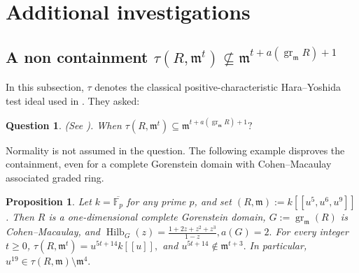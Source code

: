 \documentclass[11pt,a4paper]{amsart}
\numberwithin{equation}{section}
\newtheorem{proposition}[theorem]{Proposition}
\newtheorem{question}[theorem]{Question}
\newcommand{\gr}{\operatorname{gr}}
\newcommand{\mm}{\mathfrak m}
\begin{document}
 \section{Additional investigations}
 
 \subsection{A non containment $\tau(R,\mm^t)\nsubseteq\mm^{t+a(\gr_{\mm}R)+1}$ }
 \label{sec:q58}
 
 In this subsection, $\tau$ denotes the classical positive-characteristic
 Hara--Yoshida test ideal used in \cite{WY}. They asked:
 
 
  
 \begin{question}\label{eq:q58} (See \cite[Question 5.8]{WY}). 	When
 	$\tau(R,\mm^t)\subseteq\mm^{t+a(\gr_{\mm}R)+1}?$ 
 \end{question}
 
 Normality is not assumed
 in the  question.  
 The following example disproves the
 containment, even for a complete Gorenstein domain
 with Cohen--Macaulay associated graded ring.

 \begin{proposition}\label{thm:q58-counter}
 	Let $k=\overline{\mathbb F_p}$ for any prime $p$, and set
 	$(R,\mm):=k[[u^5,u^6,u^9]]$.
Then $R$ is a one-dimensional complete Gorenstein domain,
 	$G:=\gr_{\mm}(R)$ is Cohen--Macaulay, and
  $\operatorname{Hilb}_G(z)=\frac{1+2z+z^2+z^3}{1-z},
 a(G)=2.$
 	For every integer $t\geq0$,
 	$\tau(R,\mm^t)=u^{5t+14}k[[u]],$ and 
 	$u^{5t+14}\notin\mm^{t+3}.	$ 
 	In particular,
${u^{19}\in\tau(R,\mm)\setminus\mm^4.}$
\end{proposition}
 
\end{document}
